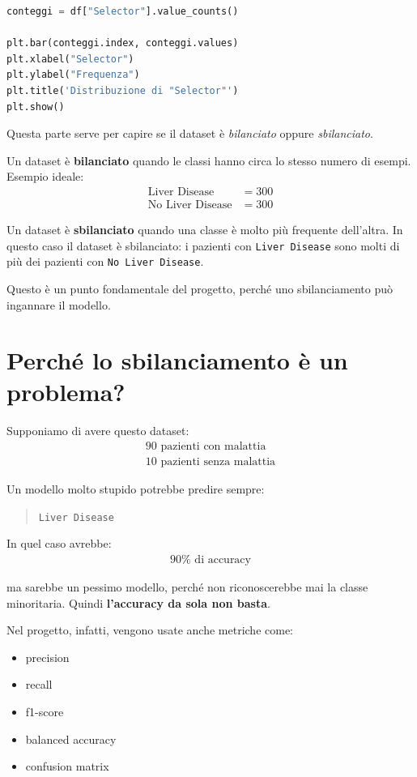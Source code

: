\documentclass[11pt,a4paper]{article}
\begin{document}
\begin{lstlisting}[language=Python]
conteggi = df["Selector"].value_counts()

plt.bar(conteggi.index, conteggi.values)
plt.xlabel("Selector")
plt.ylabel("Frequenza")
plt.title('Distribuzione di "Selector"')
plt.show()
\end{lstlisting}

Questa parte serve per capire se il dataset è \textit{bilanciato} oppure \textit{sbilanciato}.

Un dataset è \textbf{bilanciato} quando le classi hanno circa lo stesso numero di esempi. Esempio ideale:
\begin{align*}
    \text{Liver Disease}     &= 300 \\
    \text{No Liver Disease}  &= 300
\end{align*}

Un dataset è \textbf{sbilanciato} quando una classe è molto più frequente dell'altra. In questo caso il dataset è sbilanciato: i pazienti con \texttt{Liver Disease} sono molti di più dei pazienti con \texttt{No Liver Disease}.

Questo è un punto fondamentale del progetto, perché uno sbilanciamento può ingannare il modello.

\section{Perché lo sbilanciamento è un problema?}
Supponiamo di avere questo dataset:
\begin{align*}
    90 \text{ pazienti con malattia} \\
    10 \text{ pazienti senza malattia}
\end{align*}

Un modello molto stupido potrebbe predire sempre:
\begin{quote}
    \texttt{Liver Disease}
\end{quote}

In quel caso avrebbe:
\begin{align*}
    90\% \text{ di accuracy}
\end{align*}

ma sarebbe un pessimo modello, perché non riconoscerebbe mai la classe minoritaria. Quindi \textbf{l'accuracy da sola non basta}.

Nel progetto, infatti, vengono usate anche metriche come:
\begin{itemize}
    \item precision
    \item recall
    \item f1-score
    \item balanced accuracy
    \item confusion matrix
\end{itemize}
\end{document}
